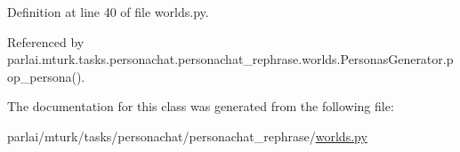 Definition at line 40 of file worlds.\+py.



Referenced by parlai.\+mturk.\+tasks.\+personachat.\+personachat\+\_\+rephrase.\+worlds.\+Personas\+Generator.\+pop\+\_\+persona().



The documentation for this class was generated from the following file\+:\begin{DoxyCompactItemize}
\item 
parlai/mturk/tasks/personachat/personachat\+\_\+rephrase/\hyperlink{parlai_2mturk_2tasks_2personachat_2personachat__rephrase_2worlds_8py}{worlds.\+py}\end{DoxyCompactItemize}
